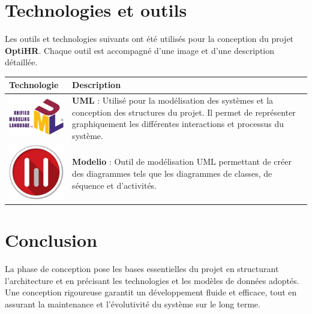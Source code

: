 \section{Technologies et outils}
Les outils et technologies suivants ont été utilisés pour la conception du projet \textbf{OptiHR}. Chaque outil est accompagné d'une image et d'une description détaillée.

\vspace{1cm} %

\renewcommand{\arraystretch}{1.5} %

\begin{center}
\begin{tabular}{|m{4cm}|m{10cm}|}
    \hline
    \textbf{Technologie} & \textbf{Description} \\
    \hline
    
    \includegraphics[width=3cm]{images/logo/uml.png} & \textbf{UML} : Utilisé pour la modélisation des systèmes et la conception des structures du projet. Il permet de représenter graphiquement les différentes interactions et processus du système. \\
    \hline
    
    \includegraphics[width=3cm]{images/logo/modelio.png} & \textbf{Modelio} : Outil de modélisation UML permettant de créer des diagrammes tels que les diagrammes de classes, de séquence et d'activités. \\
    \hline
 
  
\end{tabular}
\end{center}

\section{Conclusion}
La phase de conception pose les bases essentielles du projet en structurant l'architecture et en précisant les technologies et les modèles de données adoptés. Une conception rigoureuse garantit un développement fluide et efficace, tout en assurant la maintenance et l'évolutivité du système sur le long terme.

\clearpage
